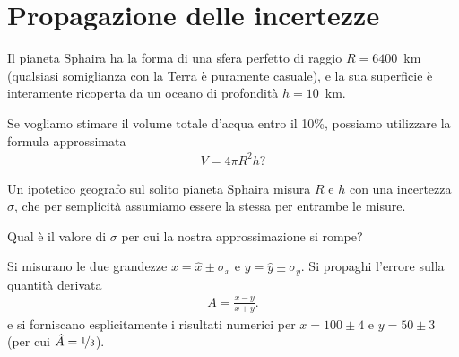 \chapter{Propagazione delle incertezze}


\begin{exercise}\label{ex:volume-spherical-cap}

Il pianeta Sphaira ha la forma di una sfera perfetto di raggio $R = 6400$~km (qualsiasi
somiglianza con la Terra è puramente casuale), e la sua superficie \`e interamente
ricoperta da un oceano di profondità $h = 10$~km.

Se vogliamo stimare il volume totale d'acqua entro il 10\%, possiamo utilizzare
la formula approssimata
\begin{align*}
  V = 4 \pi R^2 h?
\end{align*}

\end{exercise}





\begin{exercise}

Un ipotetico geografo sul solito pianeta Sphaira misura $R$ e $h$ con una incertezza
$\sigma$, che per semplicità assumiamo essere la stessa per entrambe le misure.

Qual \`e il valore di $\sigma$ per cui la nostra approssimazione si rompe?

\end{exercise}




\begin{exercise}

Si misurano le due grandezze $x = \hat{x} \pm \sigma_x$ e
$y = \hat{y} \pm \sigma_y$. Si propaghi l'errore sulla quantità derivata
\begin{align*}
  A = \frac{x - y}{x + y}.
\end{align*}
e si forniscano esplicitamente i risultati numerici per $x = 100 \pm 4$ e
$y = 50 \pm 3$ (per cui $\hat{A} = \nicefrac{1}{3}$).

\end{exercise}


